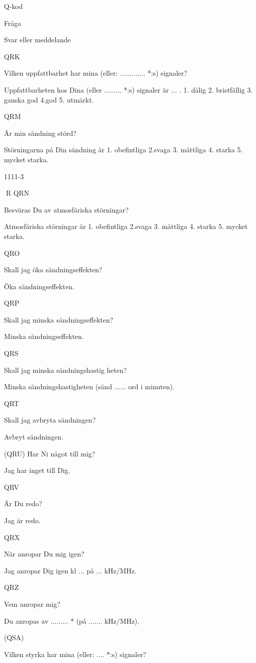 Q-kod

Fråga

Svar eller meddelande

QRK

Vilken uppfattbarhet har mina
(eller: ............. *:s) signaler?

Uppfattbarheten hos Dina
(eller ......... *:s) signaler är ... .
1. dålig
2. bristfällig
3. ganska god
4.god
5. utmärkt.

QRM

Är min sändning störd?

Störningarna på Din sändning är
1. obefintliga
2.svaga
3. måttliga
4. starka
5. mycket starka.

1111-3

R
QRN

Besväras Du av atmosfäriska
störningar?

Atmosfäriska störningar är
1. obefintliga
2.svaga
3. måttliga
4. starka
5. mycket starka.

QRO

Skall jag öka sändningseffekten?

Öka sändningseffekten.

QRP

Skall jag minska sändningseffekten?

Minska sändningseffekten.

QRS

Skall jag minska sändningshastig heten?

Minska sändningshastigheten
(sänd ...... ord i minuten).

QRT

Skall jag avbryta sändningen?

Avbryt sändningen.

(QRU) Har Ni något till mig?

Jag har inget till Dig.

QRV

Är Du redo?

Jag är redo.

QRX

När anropar Du mig igen?

Jag anropar Dig igen kl ... på ... kHz/MHz.

QRZ

Vem anropar mig?

Du anropas av ......... * (på ....... kHz/MHz).

(QSA)

Vilken styrka har mina
(eller: .... *:s) signaler?

